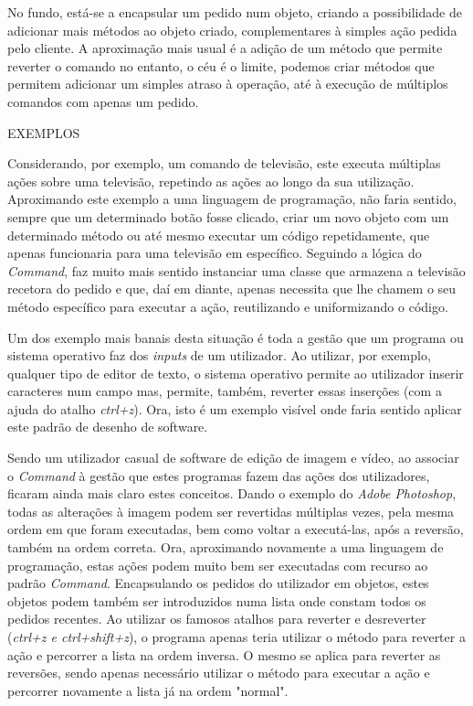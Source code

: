 \documentclass[10pt,portuguese]{article}
\begin{document}
\par No fundo, está-se a encapsular um pedido num objeto, criando a possibilidade de adicionar mais métodos ao objeto criado, complementares à simples ação pedida pelo cliente.
A aproximação mais usual é a adição de um método que permite reverter o comando no entanto, o céu é o limite, podemos criar métodos que permitem adicionar um simples atraso à operação, até à execução de múltiplos comandos com apenas um pedido.





\par EXEMPLOS

\par

Considerando, por exemplo, um comando de televisão, este executa múltiplas ações sobre uma televisão, repetindo as ações ao longo da sua utilização. Aproximando este exemplo a uma linguagem de programação, não faria sentido, sempre que um determinado botão fosse clicado, criar um novo objeto com um determinado método ou até mesmo executar um código repetidamente, que apenas funcionaria para uma televisão em específico. 
Seguindo a lógica do \textit{Command}, faz muito mais sentido instanciar uma classe que armazena a televisão recetora do pedido e que, daí em diante, apenas necessita que lhe chamem o seu método específico para executar a ação, reutilizando e uniformizando o código. 

 Um dos exemplo mais banais desta situação é toda a gestão que um programa ou sistema operativo faz dos \textit{inputs} de um utilizador. 
Ao utilizar, por exemplo, qualquer tipo de editor de texto, o sistema operativo permite ao utilizador inserir caracteres num campo mas, permite, também, reverter essas inserções (com a ajuda do atalho \textit{ctrl+z}). Ora, isto é um exemplo visível onde faria sentido aplicar este padrão de desenho de software.

\par Sendo um utilizador casual de software de edição de imagem e vídeo, ao associar o \textit{Command} à gestão que estes programas fazem das ações dos utilizadores, ficaram ainda mais claro estes conceitos. Dando o exemplo do \textit{Adobe Photoshop}, todas as alterações à imagem podem ser revertidas múltiplas vezes, pela mesma ordem em que foram executadas, bem como voltar a executá-las, após a reversão, também na ordem correta. 
Ora, aproximando novamente a uma linguagem de programação, estas ações podem muito bem ser executadas com recurso ao padrão \textit{Command}. Encapsulando os pedidos do utilizador em objetos, estes objetos podem também ser introduzidos numa lista onde constam todos os pedidos recentes. 
Ao utilizar os famosos atalhos para reverter e desreverter (\textit{ctrl+z e ctrl+shift+z}), o programa apenas teria utilizar o método para reverter a ação e percorrer a lista na ordem inversa. O mesmo se aplica para reverter as reversões, sendo apenas necessário utilizar o método para executar a ação e percorrer novamente a lista já na ordem "normal".
\end{document}
